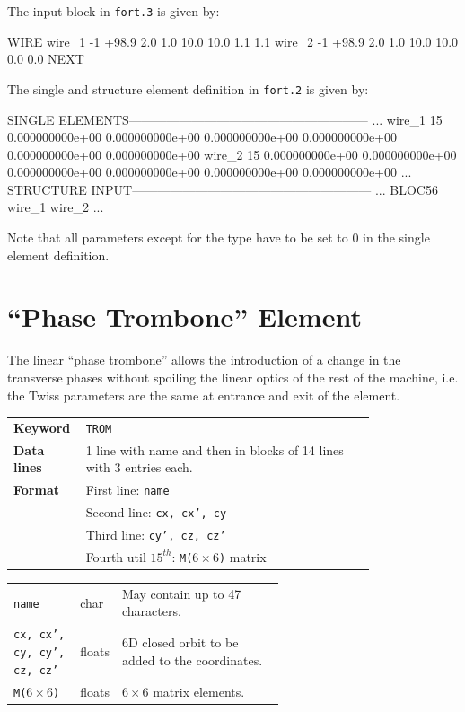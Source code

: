 The input block in \texttt{fort.3} is given by:
\begin{cverbatim}
WIRE
wire_1   -1  +98.9   2.0  1.0   10.0   10.0     1.1     1.1
wire_2   -1  +98.9   2.0  1.0   10.0   10.0     0.0     0.0
NEXT
\end{cverbatim}
The single and structure element definition in \texttt{fort.2} is given by:
\begin{ctverbatim}
SINGLE ELEMENTS---------------------------------------------------------
...
wire_1   15 0.000000000e+00 0.000000000e+00  0.000000000e+00  0.000000000e+00  0.000000000e+00  0.000000000e+00
wire_2   15 0.000000000e+00 0.000000000e+00  0.000000000e+00  0.000000000e+00  0.000000000e+00  0.000000000e+00
...
STRUCTURE INPUT---------------------------------------------------------
...
BLOC56            wire_1              wire_2
...
\end{ctverbatim}
Note that all parameters except for the type have to be set to 0 in the single element definition.

\section{``Phase Trombone'' Element} \label{Trombone}

The linear ``phase trombone'' allows the introduction of a change in the transverse phases without spoiling the linear optics of the rest of the machine, i.e. the Twiss parameters are the same at entrance and exit of the element.

\bigskip
\begin{tabular}{@{}lp{0.8\linewidth}}
    \textbf{Keyword}    & \texttt{TROM} \\
    \textbf{Data lines} & 1 line with name and then in blocks of 14 lines with 3 entries each. \\
    \textbf{Format}     & First line: \texttt{name} \\
                        & Second line: \texttt{cx, cx', cy} \\
                        & Third line: \texttt{cy', cz, cz'} \\
                        & Fourth util $15^{th}$: \texttt{M($ 6 \times 6$)} matrix 
\end{tabular}

\bigskip
\begin{tabular}{@{}llp{0.6\linewidth}}
    \texttt{name} & char & May contain up to 47 characters. \\
    \texttt{cx, cx', cy, cy', cz, cz'} & floats & 6D closed orbit to be added to the coordinates. \\
    \texttt{M($ 6 \times 6$)} & floats & $ 6 \times 6$ matrix elements.
\end{tabular}

